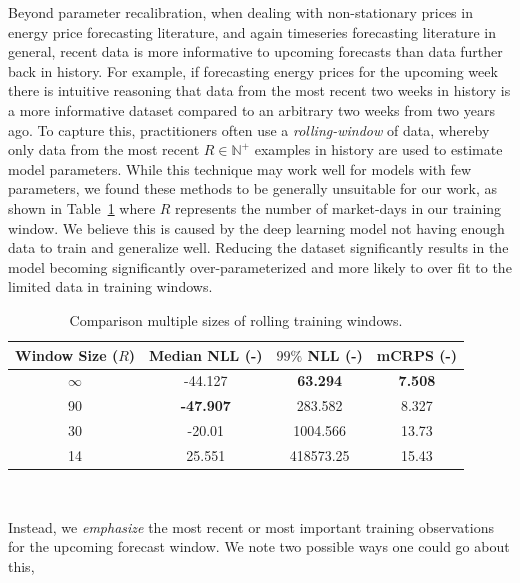 Beyond parameter recalibration, when dealing with non-stationary prices in energy price forecasting literature, and
again timeseries forecasting literature in general, recent data is more informative to upcoming forecasts than data
further back in history.
For example, if forecasting energy prices for the upcoming week there is intuitive reasoning that data from the most
recent two weeks in history is a more informative dataset compared to an arbitrary two weeks from two years ago.
To capture this, practitioners often use a \textit{rolling-window} of data, whereby only data from the most
recent $R \in \mathbb{N}^+$ examples in history are used to estimate model parameters.
While this technique may work well for models with few parameters, we found these methods to be generally
unsuitable for our work, as shown in Table~\ref{tab:rolling_window} where $R$ represents the number of market-days in our
training window.
We believe this is caused by the deep learning model not having enough data to train and generalize well.
Reducing the dataset significantly results in the model becoming significantly over-parameterized and more likely to
over fit to the limited data in training windows.

\begin{table}[htb]
    \caption[Results of reducing the training window]{
        Comparison multiple sizes of rolling training windows.
    }
    \begin{center}
        \begin{tabular}{||c|c|c|c||} \hline
        Window Size ($R$) & Median NLL (-)  & $99\%$ NLL (-) & mCRPS (-)  \\	%
        \hline \hline
        $\infty$ &         -44.127  & \textbf{63.294} & \textbf{7.508} \\ \hline
        90     & \textbf{-47.907} &        283.582  &         8.327  \\ \hline
        30     &         -20.01   &       1004.566  &        13.73   \\ \hline
        14     &          25.551  &     418573.25   &        15.43   \\ \hline
        \end{tabular}
        \\ \rule{0mm}{5mm}
    \end{center}
    \label{tab:rolling_window}
\end{table}

Instead, we \textit{emphasize} the most recent or most important training observations for the upcoming forecast window.
We note two possible ways one could go about this,

